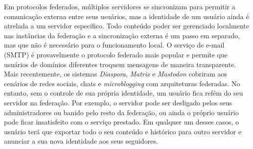 \documentclass[12pt]{article}
\newcommand{\FC} {Freechains\xspace}
\begin{document}
Em protocolos federados, múltiplos servidores se sincronizam para permitir a
comunicação externa entre seus usuários, mas a identidade de um usuário ainda é
atrelada a um servidor específico.
Todo conteúdo poder ser gerenciado localmente nas instâncias da federação e a
sincronização externa é um passo em separado, mas que não é necessário para o
funcionamento local.
%
O serviço de e-mail (SMTP) é provavelmente o protocolo federado mais popular e
permite que usuários de domínios diferentes troquem mensagens de maneira
transparente.
Mais recentemente, os sistemas \emph{Diaspora}, \emph{Matrix} e \emph{Mastodon}
cobriram aos cenários de redes sociais, chats e \emph{microblogging} com
arquiteturas federadas.
No entanto, sem o controle de sua própria identidade, um usuário fica refém do
seu servidor na federação.
Por exemplo, o servidor pode ser desligado pelos seus administradores ou banido
pelo resto da federação, ou ainda o próprio usuário pode ficar insatisfeito com
o serviço prestado.
Em qualquer um desses casos, o usuário terá que exportar todo o seu conteúdo e
histórico para outro servidor e anunciar a sua nova identidade aos seus
seguidores.

\end{document}
